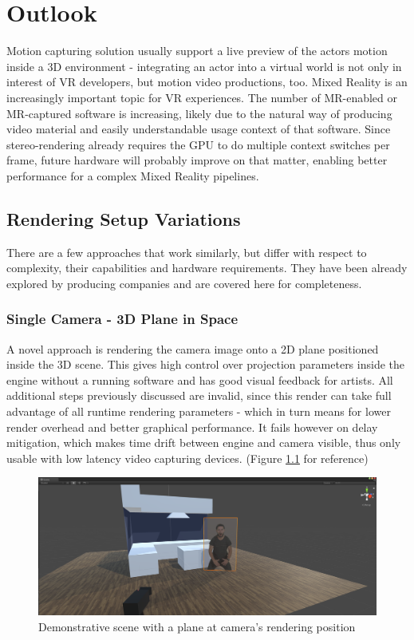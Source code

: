 %
\chapter{Outlook}

Motion capturing solution usually support a live preview of the actors motion 
inside a 3D environment - integrating an actor into a virtual world is not only 
in interest of VR developers, but motion video productions, too. Mixed Reality 
is an increasingly important topic for VR experiences. The number of MR-enabled 
or MR-captured software is increasing, likely due to the natural way of 
producing video material and easily understandable usage context of that 
software. Since stereo-rendering already requires the GPU to do multiple 
context switches per frame, future hardware will probably improve on that 
matter, enabling better performance for a complex Mixed Reality pipelines.

\section{Rendering Setup Variations}

There are a few approaches that work similarly, but differ with respect to 
complexity, their capabilities and hardware requirements. They have been 
already explored by producing companies and are covered here for completeness.

\subsection{Single Camera - 3D Plane in Space}

A novel approach is rendering the camera image onto a 2D plane positioned 
inside the 3D scene. This gives high control over projection parameters inside 
the engine without a running software and has good visual feedback for artists. 
All additional steps previously discussed are invalid, since this render can 
take full advantage of all runtime rendering parameters - which in turn means 
for lower render overhead and better graphical performance. It fails however on 
delay mitigation, which makes time drift between engine and camera visible, 
thus only usable with low latency video capturing devices. (Figure 
\ref{fig:alt-render:single-camera} for reference)

\begin{figure}[htb]
	\includegraphics[width=\textwidth]{gfx/eval/plane-scene.png}
	\caption{Demonstrative scene with a plane at camera's rendering position}
	\label{fig:alt-render:single-camera}
\end{figure}

